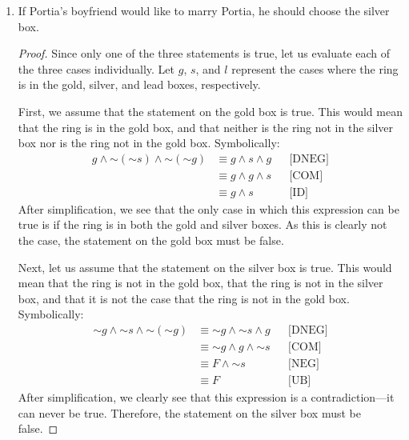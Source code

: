 \documentclass[11pt, notitlepage]{article}
\newcommand*{\oldneg}{\mathord{\sim}}
\begin{document}
\begin{enumerate}
\begin{enumerate}
\end{enumerate}

\item If Portia's boyfriend would like to marry Portia, he should choose the silver box.
\begin{proof}
Since only one of the three statements is true, let us evaluate each of the three cases individually. Let $g$, $s$, and $l$ represent the cases where the ring is in the gold, silver, and lead boxes, respectively.

First, we assume that the statement on the gold box is true. This would mean that the ring is in the gold box, and that neither is the ring not in the silver box nor is the ring not in the gold box. Symbolically:
\begin{align*}
	g \wedge \oldneg (\oldneg s) \wedge \oldneg(\oldneg g) &\equiv g \wedge s \wedge g &&\textrm{[DNEG]}\\
	&\equiv g \wedge g \wedge s &&\textrm{[COM]}\\
	&\equiv g \wedge s &&\textrm{[ID]}
\end{align*}
After simplification, we see that the only case in which this expression can be true is if the ring is in both the gold and silver boxes. As this is clearly not the case, the statement on the gold box must be false.

Next, let us assume that the statement on the silver box is true. This would mean that the ring is not in the gold box, that the ring is not in the silver box, and that it is not the case that the ring is not in the gold box. Symbolically:
\begin{align*}
	\oldneg g \wedge \oldneg s \wedge \oldneg(\oldneg g) &\equiv \oldneg g \wedge \oldneg s \wedge g &&\textrm{[DNEG]}\\
	&\equiv \oldneg g \wedge g \wedge \oldneg s &&\textrm{[COM]}\\
	&\equiv F \wedge \oldneg s &&\textrm{[NEG]}\\
	&\equiv F &&\textrm{[UB]}
\end{align*}
After simplification, we clearly see that this expression is a contradiction---it can never be true. Therefore, the statement on the silver box must be false.


\end{proof}
\end{enumerate}
\end{document}
